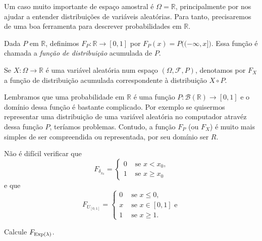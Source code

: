 Um caso muito importante de espaço amostral é $\Omega = \mathbb{R}$, principalmente por nos ajudar a entender distribuições de variáveis aleatórias.
Para tanto, precisaremos de uma boa ferramenta para descrever probabilidades em $\mathbb{R}$.

\begin{definition}
  Dada $P$ em $\mathbb{R}$, definimos $F_P:\mathbb{R} \to [0,1]$ por $F_P(x) = P\big((-\infty, x]\big)$.
  Essa função é chamada a \emph{função de distribuição} acumulada de $P$. 
\end{definition}

\begin{notation}
  Se $X:\Omega \to \mathbb{R}$ é uma variável aleatória num espaço $(\Omega, \mathcal{F}, P)$, denotamos por $F_X$  a função de distribuição acumulada correspondente à distribuição $X \circ P$.
\end{notation}

Lembramos que uma probabilidade em $\mathbb{R}$ é uma função $P:\mathcal{B}(\mathbb{R}) \to [0,1]$ e o domínio dessa função é bastante complicado.
Por exemplo se quisermos representar uma distribuição de uma variável aleatória no computador atravéz dessa função $P$, teríamos problemas.
Contudo, a função $F_P$ (ou $F_X$) é muito mais simples de ser compreendida ou representada, por seu domínio ser $R$.

\begin{example}
  Não é difícil verificar que
  \begin{equation}
    F_{\delta_{x_0}} =
    \begin{cases}
      0 & \text{ se $x < x_0$,}\\
      1 & \text{ se $x \geq x_0$}
    \end{cases}
  \end{equation}
  e que
  \begin{equation}
    F_{U_{[0,1]}} =
    \begin{cases}
      0 & \text{ se $x \leq 0$,}\\
      x & \text{ se $x \in [0,1]$ e}\\
      1 & \text{ se $x \geq 1$.}
    \end{cases}
  \end{equation}
\end{example}

\begin{exercise}
  Calcule $F_{\operatorname{Exp}(\lambda)}$.
\end{exercise}

